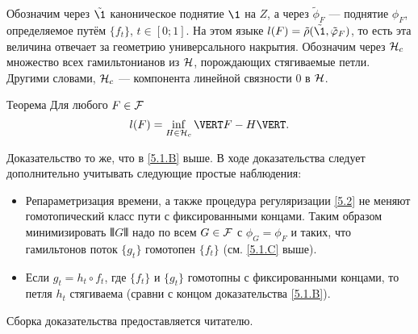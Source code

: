 Обозначим через $\tilde\1$ каноническое поднятие $\1$ на $Z$, а через
$\tilde\phi_F$ — поднятие $\phi_F$, определяемое путём $\{f_t\}$, $t
\in [0; 1]$. 
На этом языке $l (F) = \tilde\rho (\tilde\1, \tilde\phi_F)$, то есть эта величина отвечает за геометрию универсального накрытия.
Обозначим через $\mathcal{H}_c$ множество всех гамильтонианов из $\mathcal{H}$, порождающих стягиваемые петли.
Другими словами, $\mathcal{H}_c$ — компонента линейной связности $0$ в $\mathcal{H}$.

\begin{thm}{Теорема}\label{5.3.A}
Для любого $F \in \mathcal{F}$ 
\[l (F) = \inf_{H\in\H_c} \VERT F - H \VERT.\]
\end{thm}

Доказательство то же, что в \ref{5.1.B} выше.
В ходе доказательства следует дополнительно учитывать следующие простые наблюдения:
\begin{itemize}
\item Репараметризация времени, а также процедура регуляризации \ref{5.2} не меняют гомотопический класс пути с фиксированными концами.
Таким образом минимизировать $\VERT G \VERT$ надо по всем $G \in \mathcal{F}$ с $\phi_G = \phi_F$ и таких, что гамильтонов поток $\{g_t\}$ гомотопен $\{f_t\}$ (см. \ref{5.1.C} выше).
\item Если $g_t = h_t \circ f_t$, где $\{f_t\}$ и $\{g_t\}$ гомотопны с фиксированными концами, то петля $h_t$ стягиваема (сравни с концом доказательства \ref{5.1.B}).
\end{itemize}
Сборка доказательства предоставляется читателю.
